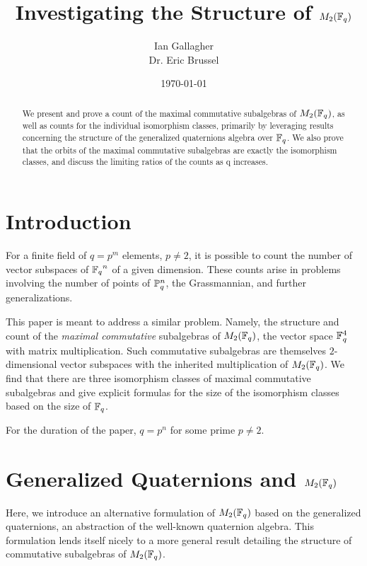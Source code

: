 \documentclass{amsart}
\title{Investigating the Structure of $M_2(\protect\mathbb{F}_q)$}
\author{Ian Gallagher \\ Dr. Eric Brussel}
\date{\today}
\begin{document}
\maketitle

\begin{abstract}
    We present and prove a count of the maximal commutative subalgebras of
    $M_2(\protect\mathbb{F}_q)$, as well as counts for the individual isomorphism classes,
    primarily by leveraging results concerning the structure of the generalized
    quaternions algebra over $\protect\mathbb{F}_q$. We also prove that the orbits of 
    the maximal commutative subalgebras are exactly the isomorphism classes,
    and discuss the limiting ratios of the counts as q increases.
\end{abstract}

\section{Introduction}
For a finite field of $q = p^m$ elements, $p \neq 2$, it is possible to count the number of
vector subspaces of ${\protect\mathbb{F}_q}^n$ of a given dimension. These counts arise in
problems involving the number of points of $\protect\mathbb{P}^n_q$, the Grassmannian,
and further generalizations. %

This paper is meant to address a similar problem. Namely, the structure and 
count of the \textit{maximal commutative} subalgebras of $M_2(\protect\mathbb{F}_q)$, the vector space $\protect\mathbb{F}_q^4$ with matrix multiplication. Such commutative subalgebras are themselves $2$-dimensional vector subspaces with the inherited multiplication of $M_2(\protect\mathbb{F}_q)$. We find that there are three isomorphism classes of maximal commutative subalgebras and give explicit formulas for the size of the isomorphism classes based on the size of $\protect\mathbb{F}_q$.


For the duration of the paper, $q = p^n$ for some prime $p \neq 2$.

\section{Generalized Quaternions and $M_2(\protect\mathbb{F}_q)$}
Here, we introduce an alternative formulation of $M_2(\protect\mathbb{F}_q)$ based on the generalized quaternions, an abstraction of the well-known quaternion algebra. This formulation lends itself nicely to a more general result detailing the structure of commutative subalgebras of $M_2(\protect\mathbb{F}_q)$.
\end{document}
